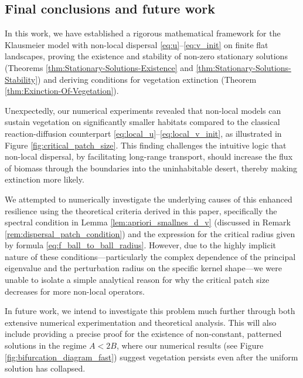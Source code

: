 \documentclass[review,onefignum,onetabnum]{SIAM-styles/siamart171218}
\begin{document}
\subsection{Final conclusions and future work}

In this work, we have established a rigorous mathematical framework for the Klausmeier model with non-local dispersal \eqref{eq:u}--\eqref{eq:v_init} on finite flat landscapes, proving the existence and stability of non-zero stationary solutions (Theorems \ref{thm:Stationary-Solutions-Existence} and \ref{thm:Stationary-Solutions-Stability}) and deriving conditions for vegetation extinction (Theorem \ref{thm:Exinction-Of-Vegetation}). 

Unexpectedly, our numerical experiments revealed that non-local models can sustain vegetation on significantly smaller habitats compared to the classical reaction-diffusion counterpart \eqref{eq:local_u}--\eqref{eq:local_v_init}, as illustrated in Figure \ref{fig:critical_patch_size}.
This finding challenges the intuitive logic that non-local dispersal, by facilitating long-range transport, should increase the flux of biomass through the boundaries into the uninhabitable desert, thereby making extinction more likely.

We attempted to numerically investigate the underlying causes of this enhanced resilience using the theoretical criteria derived in this paper, specifically the spectral condition in Lemma \ref{lem:apriori_smallnes_d_v} (discussed in Remark \ref{rem:dispersal_patch_condition}) and the expression for the critical radius given by formula \eqref{eq:f_ball_to_ball_radius}. 
However, due to the highly implicit nature of these conditions—particularly the complex dependence of the principal eigenvalue and the perturbation radius on the specific kernel shape—we were unable to isolate a simple analytical reason for why the critical patch size decreases for more non-local operators.

In future work, we intend to investigate this problem much further through both extensive numerical experimentation and theoretical analysis. 
This will also include providing a precise proof for the existence of non-constant, patterned solutions in the regime $A < 2B$, where our numerical results (see Figure \ref{fig:bifurcation_diagram_fast}) suggest vegetation persists even after the uniform solution has collapsed.



\end{document}
